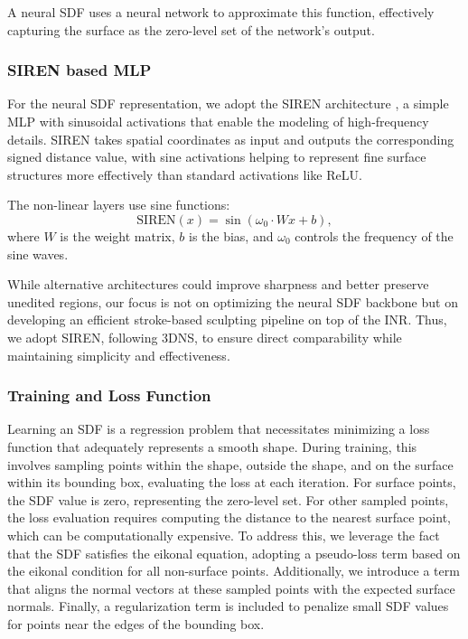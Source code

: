 A neural SDF uses a neural network to approximate this function, effectively capturing the surface as the zero-level set of the network's output.

\subsubsection{SIREN based MLP}

For the neural SDF representation, we adopt the SIREN architecture \cite{sitzmann2020implicit}, a simple MLP with sinusoidal activations that enable the modeling of high-frequency details. SIREN takes spatial coordinates as input and outputs the corresponding signed distance value, with sine activations helping to represent fine surface structures more effectively than standard activations like ReLU.  

The non-linear layers use sine functions:  
\begin{equation}  
\text{SIREN}(x) = \sin(\omega_0 \cdot W x + b),  
\end{equation}  
where \( W \) is the weight matrix, \( b \) is the bias, and \( \omega_0 \) controls the frequency of the sine waves.  


While alternative architectures could improve sharpness and better preserve unedited regions, our focus is not on optimizing the neural SDF backbone but on developing an efficient stroke-based sculpting pipeline on top of the INR. Thus, we adopt SIREN, following 3DNS, to ensure direct comparability while maintaining simplicity and effectiveness.

\subsubsection{Training and Loss Function}
Learning an SDF is a regression problem that necessitates minimizing a loss function that adequately represents a smooth shape. During training, this involves sampling points within the shape, outside the shape, and on the surface within its bounding box, evaluating the loss at each iteration. For surface points, the SDF value is zero, representing the zero-level set. For other sampled points, the loss evaluation requires computing the distance to the nearest surface point, which can be computationally expensive. To address this, we leverage the fact that the SDF satisfies the eikonal equation, adopting a pseudo-loss term based on the eikonal condition for all non-surface points. Additionally, we introduce a term that aligns the normal vectors at these sampled points with the expected surface normals. Finally, a regularization term is included to penalize small SDF values for points near the edges of the bounding box.

